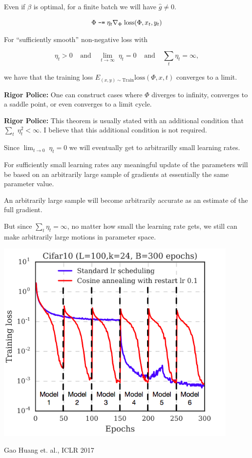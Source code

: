 {\vfill
Even if $\beta$ is optimal, for a finite batch we will have $\hat{g} \not = 0$.


$$\Phi \;\mbox{\tt -=} \; \eta_t \nabla_\Phi\;\mathrm{loss}(\Phi,x_t,y_t)$$

\vfill
For ``sufficiently smooth'' non-negative loss with

\vfill
$$\eta_t > 0\;\;\;\;\mbox{and}\;\;\;\;\lim_{t \rightarrow \infty} \;\eta_t = 0\;\;\;\;\mbox{and}\;\;\;\;\sum_t \eta_t = \infty,$$

\vfill
we have that the training loss $E_{(x,y) \sim \mathrm{Train}} \mathrm{loss}(\Phi,x,t)$ converges to a limit.

\vfill
{\Large
\vfill
{\bf Rigor Police:} One can construct cases where $\Phi$ diverges to infinity, converges to a saddle point, or even converges to a limit cycle.

\vfill
{\bf Rigor Police:} This theorem is usually stated with an additional condition that $\sum_t \;\eta_t^2 < \infty$.  I believe that this additional condition is not required.

}


Since $\lim_{t \rightarrow 0} \;\eta_t = 0$ we will eventually get to arbitrarilly small learning rates.

\vfill
For sufficiently small learning rates any meaningful update of the parameters will be based on an arbitrarily large sample
of gradients at essentially the same parameter value.

\vfill
An arbitrarily large sample will become arbitrarily accurate as an estimate of the full gradient.

\vfill
But since $\sum_t \eta_t = \infty$, no matter how small the learning rate gets, we still can make arbitrarily large motions in parameter space.


\centerline{\includegraphics[height= 4in]{../images/AnnealingSGD}}
\centerline{\Large Gao Huang et. al., ICLR 2017}

}
